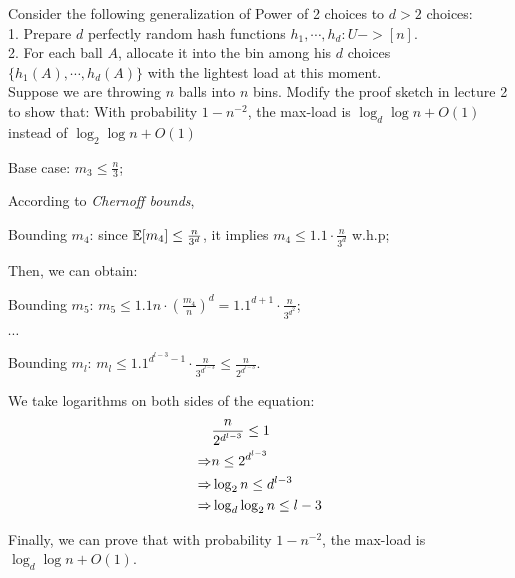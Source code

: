 \begin{problem}[20 points]
Consider the following generalization of Power of 2 choices to $d > 2$ choices: \\
1. Prepare $d$ perfectly random hash functions $h_1, \cdots, h_d : U -> [n]$. \\
2. For each ball $A$, allocate it into the bin among his $d$ choices $\{h_1(A), \cdots, h_d(A)\}$ with the lightest load at this moment. \\

Suppose we are throwing $n$ balls into $n$ bins. Modify the proof sketch in lecture 2 to show that: With probability $1 - n^{-2}$, 
the max-load is $\log_d{\log n} + O(1)$ instead of $\log_2{\log n} + O(1)$

\Answer

Base case: $m_3 \le \frac{n}{3}$;

According to \textit{Chernoff bounds},

Bounding $m_4$: since $\operatorname*{\mathbb{E}}[m_4] \le \frac{n}{3^d}$, it implies $m_4 \le 1.1 \cdot \frac{n}{3^d}$ w.h.p;

Then, we can obtain:

Bounding $m_5$: $m_5 \le 1.1n \cdot (\frac{m_4}{n})^d = 1.1^{d+1} \cdot \frac{n}{3^{d^2}}$;

$\cdots$

Bounding $m_l$: $m_l \le 1.1^{d^{l-3}-1} \cdot \frac{n}{3^{d^{l-3}}} \le \frac{n}{2^{d^{l-3}}}$.

We take logarithms on both sides of the equation:
\begin{equation}
\begin{aligned}
& \frac{n}{2^{d^{l-3}}} \le 1\\ \notag
\Rightarrow & n \le 2^{d^{l-3}} \\
\Rightarrow & \log_2 n \le d^{l-3} \\
\Rightarrow & \log_d{\log_2 n} \le l-3
\end{aligned}
\end{equation}

Finally, we can prove that with probability $1 - n^{-2}$, the max-load is $\log_d{\log n} + O(1)$.
\end{problem}


